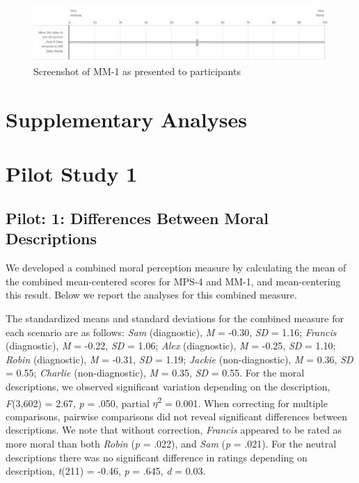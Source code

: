 \documentclass[
  american,
  man,mask,floatsintext]{apa6}
\begin{document}
\begin{figure}
\centering
\includegraphics{../resources/images/mm1.png}
\caption{Screenshot of MM-1 as presented to participants}
\end{figure}

\newpage

\hypertarget{supplementary-analyses}{%
\section{Supplementary Analyses}\label{supplementary-analyses}}

\hypertarget{pilot-study-1}{%
\section{Pilot Study 1}\label{pilot-study-1}}

\hypertarget{pilot-1-differences-between-moral-descriptions}{%
\subsection{Pilot: 1: Differences Between Moral Descriptions}\label{pilot-1-differences-between-moral-descriptions}}

We developed a combined moral perception measure by calculating the mean of the combined mean-centered scores for MPS-4 and MM-1, and mean-centering this result. Below we report the analyses for this combined measure.

The standardized means and standard deviations for the combined measure for each scenario are as follows:
\emph{Sam} (diagnostic),
\emph{M} = -0.30, \emph{SD} = 1.16;
\emph{Francis} (diagnostic),
\emph{M} = -0.22, \emph{SD} = 1.06;
\emph{Alex} (diagnostic),
\emph{M} = -0.25, \emph{SD} = 1.10;
\emph{Robin} (diagnostic),
\emph{M} = -0.31, \emph{SD} = 1.19;
\emph{Jackie} (non-diagnostic),
\emph{M} = 0.36, \emph{SD} = 0.55;
\emph{Charlie} (non-diagnostic),
\emph{M} = 0.35, \emph{SD} = 0.55. For the moral descriptions, we observed significant variation depending on the description, \emph{F}(3,602) = 2.67, \emph{p} = .050, partial \(\eta\)\textsuperscript{2} = 0.001. When correcting for multiple comparisons, pairwise comparisons did not reveal significant differences between descriptions. We note that without correction, \emph{Francis} appeared to be rated as more moral than both \emph{Robin} (\emph{p} = .022), and \emph{Sam} (\emph{p} = .021). For the neutral descriptions there was no significant difference in ratings depending on description, \emph{t}(211) = -0.46, \emph{p} = .645, \emph{d} = 0.03.
\end{document}
